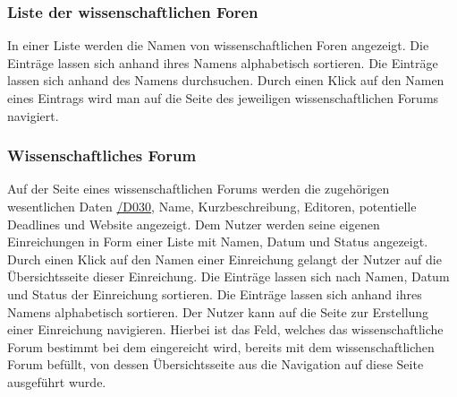 \subsubsection{Liste der wissenschaftlichen Foren}
\begin{description}
     In einer Liste werden die Namen von wissenschaftlichen Foren angezeigt.
     Die Einträge lassen sich anhand ihres Namens alphabetisch sortieren.
     Die Einträge lassen sich anhand des Namens durchsuchen.
     Durch einen Klick auf den Namen eines Eintrags wird man auf die Seite des
    jeweiligen wissenschaftlichen Forums navigiert.
\end{description}

\subsubsection{Wissenschaftliches Forum}
\begin{description}
     Auf der Seite eines wissenschaftlichen Forums werden die zugehörigen wesentlichen Daten \hyperref[d030]{/D030},
    Name, Kurzbeschreibung, Editoren, potentielle Deadlines und Website angezeigt.
     Dem Nutzer werden seine eigenen Einreichungen in Form einer Liste mit Namen, Datum und Status
    angezeigt.
     Durch einen Klick auf den Namen einer Einreichung gelangt der Nutzer auf die Übersichtsseite
    dieser Einreichung.
     Die Einträge lassen sich nach Namen, Datum und Status
    der Einreichung sortieren.
     Die Einträge lassen sich anhand ihres Namens alphabetisch sortieren.
     Der Nutzer kann auf die Seite zur Erstellung einer Einreichung navigieren. Hierbei ist
    das Feld, welches das wissenschaftliche Forum bestimmt bei dem eingereicht wird, bereits mit
    dem wissenschaftlichen Forum befüllt, von dessen Übersichtsseite aus die Navigation auf diese
    Seite ausgeführt wurde.
\end{description}

